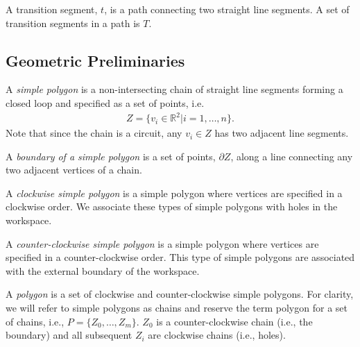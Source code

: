 \documentclass[../main.tex]{subfiles}
\begin{document}
\begin{definition}
A transition segment, $t$, is a path connecting two straight line segments. A set of transition segments in a path is $T$.
\end{definition}

\subsection{Geometric Preliminaries}
\begin{definition}
A \emph{simple polygon} is a non-intersecting chain of straight line segments forming a closed loop and specified as a set of points, i.e.
	\begin{equation}
	\begin{aligned}
		Z=\{v_i\in\mathbb{R}^2|i=1,\ldots,n\}.
	\end{aligned}
	\end{equation}
Note that since the chain is a circuit, any $v_i\in Z$ has two adjacent line segments. 
\end{definition}

\begin{definition}
A \emph{boundary of a simple polygon} is a set of points, $\partial Z$, along a line connecting any two adjacent vertices of a chain. 
\end{definition}

\begin{definition}
A \emph{clockwise simple polygon} is a simple polygon where vertices are specified in a clockwise order. We associate these types of simple polygons with holes in the workspace. 
\end{definition}

\begin{definition}
A \emph{counter-clockwise simple polygon} is a simple polygon where vertices are specified in a counter-clockwise order. This type of simple polygons are associated with the external boundary of the workspace.
\end{definition}

\begin{definition}[Polygon]
A \emph{polygon} is a set of clockwise and counter-clockwise simple polygons. For clarity, we will refer to simple polygons as chains and reserve the term polygon for a set of chains, i.e., $P=\{Z_0,\ldots,Z_m\}$. $Z_0$ is a counter-clockwise chain (i.e., the boundary) and all subsequent $Z_i$ are clockwise chains (i.e., holes). 
\end{definition}
\end{document}
